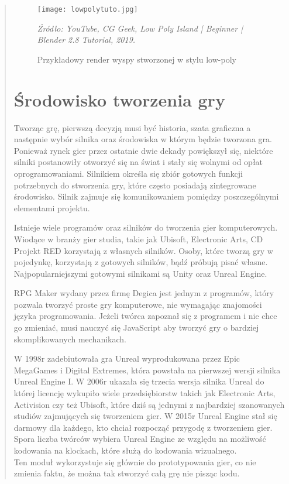 \begin{quotation}
\begin{figure}[hbt!]
\centering
  \texttt{[image: lowpolytuto.jpg]}
  \caption{Przykładowy render wyspy stworzonej w stylu low-poly}\label{rys_1}
  \begin{minipage}[t]{0.75\linewidth}
    \emph{Źródło: YouTube, CG Geek, Low Poly Island | Beginner | Blender 2.8 Tutorial, 2019.}
  \end{minipage}
\end{figure}


\section{Środowisko tworzenia gry}

\indent Tworząc grę, pierwszą decyzją musi być historia, szata graficzna a następnie wybór silnika oraz środowiska w którym będzie tworzona gra. Ponieważ rynek gier przez ostatnie dwie dekady powiększył się, niektóre silniki postanowiły otworzyć się na świat i stały się wolnymi od opłat oprogramowaniami. Silnikiem określa się zbiór gotowych funkcji potrzebnych do stworzenia gry, które często posiadają zintegrowane środowisko. Silnik zajmuje się komunikowaniem pomiędzy poszczególnymi elementami projektu.

\indent Istnieje wiele programów oraz silników do tworzenia gier komputerowych. Wiodące w branży gier studia, takie jak Ubisoft, Electronic Arts, CD Projekt RED korzystają z własnych silników. Osoby, które tworzą gry w pojedynkę, korzystają z gotowych silników, bądź próbują pisać własne. Najpopularniejszymi gotowymi silnikami są Unity oraz Unreal Engine.

\indent RPG Maker wydany przez firmę Degica jest jednym z programów, który pozwala tworzyć proste gry komputerowe, nie wymagając znajomości języka programowania. Jeżeli twórca zapoznał się z programem i nie chce go zmieniać, musi nauczyć się JavaScript aby tworzyć gry o bardziej skomplikowanych mechanikach.

\indent W 1998r zadebiutowała gra Unreal wyprodukowana przez Epic MegaGames i Digital Extremes, która powstała na pierwszej wersji silnika Unreal Engine I. W 2006r ukazała się trzecia wersja silnika Unreal do której licencję wykupiło wiele przedsiębiorstw takich jak Electronic Arts, Activision czy też Ubisoft, które dziś są jednymi z najbardziej szanowanych studiów zajmujących się tworzeniem gier. W 2015r Unreal Engine stał się darmowy dla każdego, kto chciał rozpocząć przygodę z tworzeniem gier. Spora liczba twórców wybiera Unreal Engine ze względu na możliwość kodowania na klockach, które służą do kodowania wizualnego. \\
Ten moduł wykorzystuje się głównie do prototypowania gier, co nie zmienia faktu, że można tak stworzyć całą grę nie pisząc kodu.


\end{quotation}
